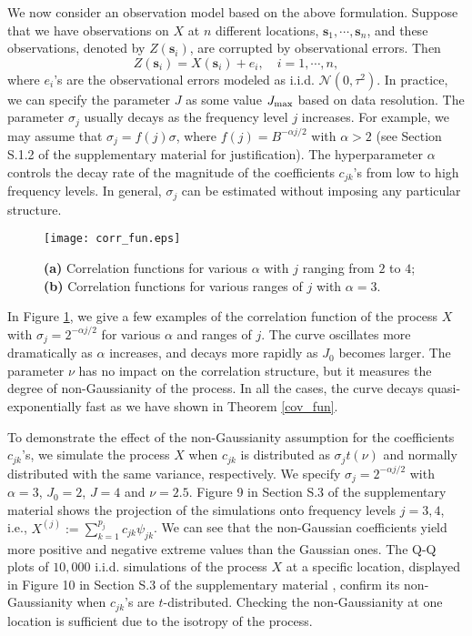 \documentclass[aoas,preprint]{imsart}
\numberwithin{equation}{section}
\theoremstyle{plain}
\begin{document}
We now consider an observation model based on the above formulation. Suppose that we have observations on $X$ at $n$ different locations, $\mathbf{s}_1, \cdots, \mathbf{s}_n$, and these observations, denoted by $Z(\mathbf{s}_i)$, are corrupted by observational errors. Then
\begin{equation}\label{obs_model}
Z(\mathbf{s}_i)=X(\mathbf{s}_i)+e_i, \quad i=1,\cdots, n,
\end{equation}
where $e_i$'s are the observational errors modeled as i.i.d. $\mathcal{N}(0, \tau^2)$. In practice, we can specify the parameter $J$ as some value $J_{\rm max}$ based on data resolution. The parameter $\sigma_j$ usually decays as the frequency level $j$ increases. For example, we may assume that $\sigma_j=f(j)\sigma$, where $f(j)=B^{-\alpha j/2}$ with $\alpha>2$ (see Section S.1.2 of the supplementary material \citet{Fan-17-supp} for justification). The hyperparameter $\alpha$ controls the decay rate of the magnitude of the coefficients $c_{jk}$'s from low to high frequency levels. 
In general,  $\sigma_j$ can be estimated without imposing any particular structure.


\begin{figure}[htbp] %
   \centering
   \texttt{[image: corr\_fun.eps]} 
   \caption{\textbf{(a)} Correlation functions for various $\alpha$ with $j$ ranging from $2$ to $4$; \textbf{(b)} Correlation functions for various ranges of $j$ with $\alpha=3$.}
   \label{fig:corr_fun}
\end{figure}

In Figure \ref{fig:corr_fun}, we give a few examples of the correlation function of the process $X$ with $\sigma_j=2^{-\alpha j/2}$ for various $\alpha$ and ranges of $j$. The curve oscillates more dramatically as $\alpha$ increases, and decays more rapidly as $J_0$ becomes larger. The parameter $\nu$ has no impact on the correlation structure, but it measures the degree of non-Gaussianity of the process. In all the cases, the curve decays quasi-exponentially fast as we have shown in Theorem \ref{cov_fun}.

To demonstrate the effect of the non-Gaussianity assumption for the coefficients $c_{jk}$'s, we simulate the process $X$ when $c_{jk}$ is distributed as $\sigma_jt(\nu)$ and normally distributed with the same variance, respectively. We specify $\sigma_j=2^{-\alpha j/2}$ with $\alpha=3$, $J_0=2$, $J=4$ and $\nu=2.5$. Figure 9 in Section S.3 of the supplementary material \citep{Fan-17-supp} shows the projection of the simulations onto frequency levels $j=3, 4$, i.e., $X^{(j)}:=\sum_{k=1}^{p_j}c_{jk}\psi_{jk}$. We can see that the non-Gaussian coefficients yield more positive and negative extreme values than the Gaussian ones. The Q-Q plots of $10,000$ i.i.d. simulations of the process $X$ at a specific location, displayed in Figure 10 in Section S.3 of the supplementary material \citep{Fan-17-supp}, confirm its non-Gaussianity when $c_{jk}$'s are $t$-distributed. Checking the non-Gaussianity at one location is sufficient due to the isotropy of the process.
\end{document}
